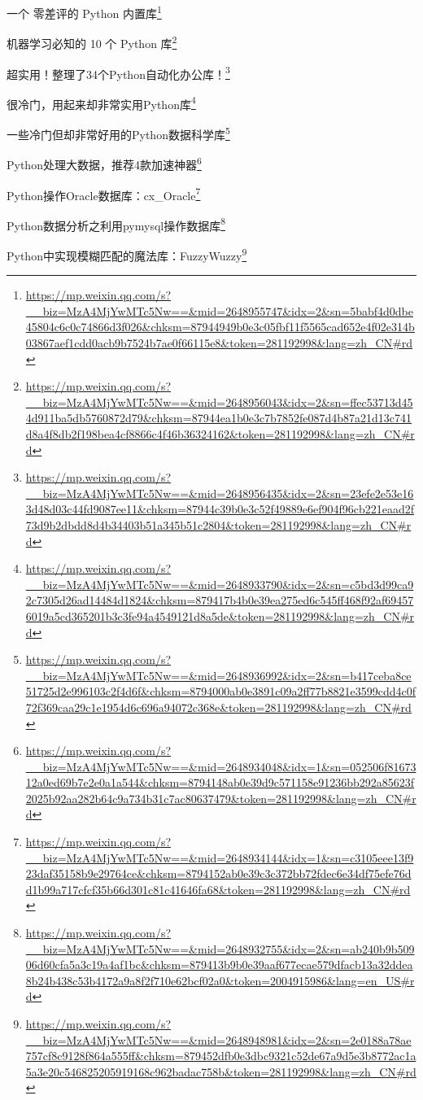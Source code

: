 \documentclass[]{ctexbook}
\renewcommand{\href}[2]{#2\footnote{\url{#1}}}
\begin{document}
\href{https://mp.weixin.qq.com/s?__biz=MzA4MjYwMTc5Nw==\&mid=2648955747\&idx=2\&sn=5babf4d0dbe45804c6c0c74866d3f026\&chksm=87944949b0e3c05fbf11f5565cad652e4f02e314b03867aef1cdd0acb9b7524b7ae0f66115e8\&token=281192998\&lang=zh_CN\#rd}{一个 零差评的 Python 内置库}

\href{https://mp.weixin.qq.com/s?__biz=MzA4MjYwMTc5Nw==\&mid=2648956043\&idx=2\&sn=ffec53713d454d911ba5db5760872d79\&chksm=87944ea1b0e3c7b7852fe087d4b87a21d13c741d8a4f8db2f198bea4cf8866c4f46b36324162\&token=281192998\&lang=zh_CN\#rd}{机器学习必知的 10 个 Python 库}

\href{https://mp.weixin.qq.com/s?__biz=MzA4MjYwMTc5Nw==\&mid=2648956435\&idx=2\&sn=23efe2e53e163d48d03c44fd9087ee11\&chksm=87944c39b0e3c52f49889e6ef904f96cb221eaad2f73d9b2dbdd8d4b34403b51a345b51c2804\&token=281192998\&lang=zh_CN\#rd}{超实用！整理了34个Python自动化办公库！}

\href{https://mp.weixin.qq.com/s?__biz=MzA4MjYwMTc5Nw==\&mid=2648933790\&idx=2\&sn=c5bd3d99ca92c7305d26ad14484d1824\&chksm=879417b4b0e39ea275ed6c545ff468f92af694576019a5cd365201b3c3fe94a4549121d8a5de\&token=281192998\&lang=zh_CN\#rd}{很冷门，用起来却非常实用Python库}

\href{https://mp.weixin.qq.com/s?__biz=MzA4MjYwMTc5Nw==\&mid=2648936992\&idx=2\&sn=b417ceba8ce51725d2e996103c2f4d6f\&chksm=8794000ab0e3891c09a2ff77b8821e3599cdd4c0f72f369caa29c1e1954d6c696a94072c368e\&token=281192998\&lang=zh_CN\#rd}{一些冷门但却非常好用的Python数据科学库}

\href{https://mp.weixin.qq.com/s?__biz=MzA4MjYwMTc5Nw==\&mid=2648934048\&idx=1\&sn=052506f8167312a0ed69b7e2e0a1a544\&chksm=8794148ab0e39d9c571158e91236bb292a85623f2025b92aa282b64c9a734b31c7ac80637479\&token=281192998\&lang=zh_CN\#rd}{Python处理大数据，推荐4款加速神器}

\href{https://mp.weixin.qq.com/s?__biz=MzA4MjYwMTc5Nw==\&mid=2648934144\&idx=1\&sn=c3105eee13f923daf35158b9e29764ce\&chksm=8794152ab0e39c3c372bb72fdec6e34df75efe76dd1b99a717cfcf35b66d301c81c41646fa68\&token=281192998\&lang=zh_CN\#rd}{Python操作Oracle数据库：cx\_Oracle}

\href{https://mp.weixin.qq.com/s?__biz=MzA4MjYwMTc5Nw==\&mid=2648932755\&idx=2\&sn=ab240b9b50906d60cfa5a3c19a4af1bc\&chksm=879413b9b0e39aaf677ecae579dfacb13a32ddea8b24b438c53b4172a9a8f2f710e62bcf02a0\&token=2004915986\&lang=en_US\#rd}{Python数据分析之利用pymysql操作数据库}

\href{https://mp.weixin.qq.com/s?__biz=MzA4MjYwMTc5Nw==\&mid=2648948981\&idx=2\&sn=2e0188a78ae757cf8c9128f864a555ff\&chksm=879452dfb0e3dbc9321c52de67a9d5e3b8772ac1a5a3e20c546825205919168c962badac758b\&token=281192998\&lang=zh_CN\#rd}{Python中实现模糊匹配的魔法库：FuzzyWuzzy}
\end{document}
